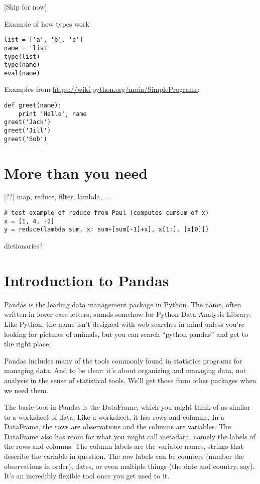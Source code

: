 \documentclass[11pt]{article}
\begin{document}
[Skip for now]

Example of how types work

\begin{verbatim}
list = ['a', 'b', 'c']
name = 'list'
type(list)
type(name)
eval(name)
\end{verbatim}


Examples from \url{https://wiki.python.org/moin/SimplePrograms}:
\begin{verbatim}
def greet(name):
    print 'Hello', name
greet('Jack')
greet('Jill')
greet('Bob')
\end{verbatim}

\section{More than you need}

[??] map, reduce, filter, lambda, ...

\begin{verbatim}
# test example of reduce from Paul (computes cumsum of x)
x = [1, 4, -2]
y = reduce(lambda sum, x: sum+[sum[-1]+x], x[1:], [x[0]])
\end{verbatim}

dictionaries?


\section{Introduction to Pandas}

Pandas is the leading data management package in Python.
The name, often written in lower case letters,
stands somehow for Python Data Analysis Library.
Like Python, the name isn't designed with web searches in mind
unless you're looking for pictures of animals,
but you can search ``python pandas'' and get to the right place.

Pandas includes many of the tools commonly found in statistics programs
for managing data.
And to be clear:   it's about organizing and managing data, not
analysis in the sense of statistical tools.
We'll get those from other packages when we need them.

The basic tool in Pandas is the DataFrame,
which you might think of as similar to a worksheet of data.
Like a worksheet, it has rows and columns.
In a DataFrame, the rows are observations and the columns are variables.
The DataFrame also has room for what you might call metadata,
namely the labels of the rows and columns.
The column labels are the variable names, strings that describe
the variable in question.
The row labels can be counters (number the observations in order),
dates, or even multiple things (the date and country, say).
It's an incredibly flexible tool once you get used to it.
\end{document}
